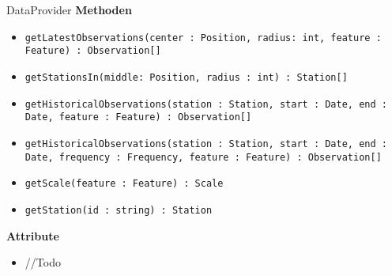 \begin{Class}{DataProvider}
    \textbf{Methoden}
    \begin{itemize}
        \item \texttt{getLatestObservations(center : Position, radius: int, feature : Feature) : Observation[]}
        \item \texttt{getStationsIn(middle: Position, radius : int) : Station[]}
        \item \texttt{getHistoricalObservations(station : Station, start : Date, end : Date, feature : Feature) : Observation[]}
        \item \texttt{getHistoricalObservations(station : Station, start : Date, end : Date, frequency : Frequency, feature : Feature) : Observation[]}
        \item \texttt{getScale(feature : Feature) : Scale}
        \item \texttt{getStation(id : string) : Station}
    \end{itemize}
    
    \textbf{Attribute}
    \begin{itemize}
        \item //Todo
    \end{itemize}
\end{Class}